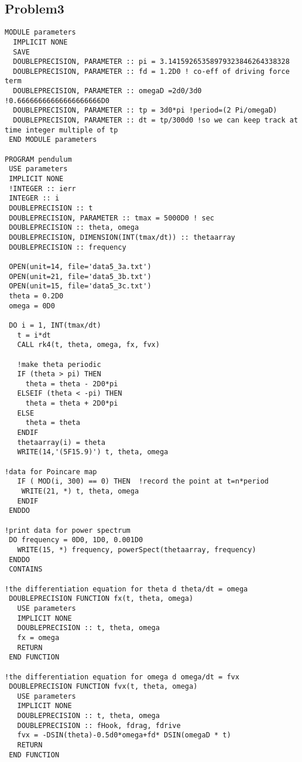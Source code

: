 \documentclass{article}
\begin{document}
\subsection*{Problem3}
 \begin{verbatim}
MODULE parameters
  IMPLICIT NONE
  SAVE
  DOUBLEPRECISION, PARAMETER :: pi = 3.14159265358979323846264338328
  DOUBLEPRECISION, PARAMETER :: fd = 1.2D0 ! co-eff of driving force term
  DOUBLEPRECISION, PARAMETER :: omegaD =2d0/3d0    !0.66666666666666666666D0
  DOUBLEPRECISION, PARAMETER :: tp = 3d0*pi !period=(2 Pi/omegaD)
  DOUBLEPRECISION, PARAMETER :: dt = tp/300d0 !so we can keep track at time integer multiple of tp
 END MODULE parameters           

PROGRAM pendulum
 USE parameters
 IMPLICIT NONE
 !INTEGER :: ierr
 INTEGER :: i
 DOUBLEPRECISION :: t
 DOUBLEPRECISION, PARAMETER :: tmax = 5000D0 ! sec
 DOUBLEPRECISION :: theta, omega
 DOUBLEPRECISION, DIMENSION(INT(tmax/dt)) :: thetaarray
 DOUBLEPRECISION :: frequency

 OPEN(unit=14, file='data5_3a.txt')
 OPEN(unit=21, file='data5_3b.txt')
 OPEN(unit=15, file='data5_3c.txt')
 theta = 0.2D0
 omega = 0D0
 
 DO i = 1, INT(tmax/dt)
   t = i*dt
   CALL rk4(t, theta, omega, fx, fvx)
  
   !make theta periodic
   IF (theta > pi) THEN
     theta = theta - 2D0*pi
   ELSEIF (theta < -pi) THEN
     theta = theta + 2D0*pi
   ELSE
     theta = theta
   ENDIF
   thetaarray(i) = theta   
   WRITE(14,'(5F15.9)') t, theta, omega

!data for Poincare map
   IF ( MOD(i, 300) == 0) THEN  !record the point at t=n*period
    WRITE(21, *) t, theta, omega
   ENDIF
 ENDDO

!print data for power spectrum
 DO frequency = 0D0, 1D0, 0.001D0
   WRITE(15, *) frequency, powerSpect(thetaarray, frequency)
 ENDDO
 CONTAINS

!the differentiation equation for theta d theta/dt = omega
 DOUBLEPRECISION FUNCTION fx(t, theta, omega)
   USE parameters
   IMPLICIT NONE
   DOUBLEPRECISION :: t, theta, omega
   fx = omega
   RETURN
 END FUNCTION
  
!the differentiation equation for omega d omega/dt = fvx
 DOUBLEPRECISION FUNCTION fvx(t, theta, omega)
   USE parameters
   IMPLICIT NONE
   DOUBLEPRECISION :: t, theta, omega
   DOUBLEPRECISION :: fHook, fdrag, fdrive
   fvx = -DSIN(theta)-0.5d0*omega+fd* DSIN(omegaD * t)
   RETURN
 END FUNCTION


\end{verbatim}
\end{document}
